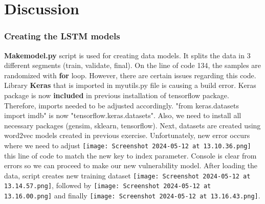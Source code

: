 \chapter{Discussion}\label{chap:discussion}


\subsection{\textbf{Creating the LSTM models}}


   \textbf{Makemodel.py} script is used for creating data models. It splits the data in 3 different segments (train, validate, final).
   On the line of code 134, the samples are randomized with \textbf{for} loop. However, there are certain issues regarding this code. 
   Library \textbf{Keras} that is imported in myutils.py file is causing a build error. 
   Keras package is now \textbf{included} in previous installation of tensorflow package. 
   Therefore, imports needed to be adjusted accordingly. 
   "from keras.datasets import imdb" is now "tensorflow.keras.datasets". 
   Also, we need to install all necessary packages (gensim, sklearn, tensorflow). 
   Next, datasets are created using word2vec models created in previous exercise. 
   Unfortunately, new error occurs where we need to adjust \texttt{[image: Screenshot 2024-05-12 at 13.10.36.png]} this line of code to match the new key to index parameter. 
   Console is clear from errors so we can proceed to make our new vulnerability model. 
   After loading the data, script creates new training dataset \texttt{[image: Screenshot 2024-05-12 at 13.14.57.png]}, followed by \texttt{[image: Screenshot 2024-05-12 at 13.16.00.png]} and finally \texttt{[image: Screenshot 2024-05-12 at 13.16.43.png]}.
                 
   


   
   